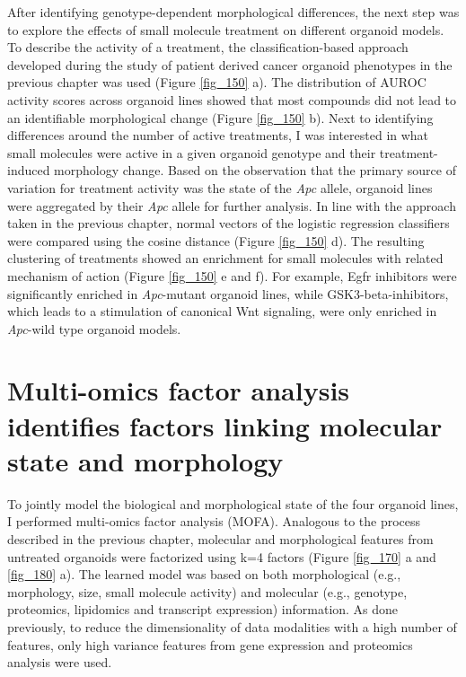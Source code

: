 \begin{flushleft}
After identifying genotype-dependent morphological differences, the next step was to explore the effects of small molecule treatment on different organoid models. To describe the activity of a treatment, the classification-based approach developed during the study of patient derived cancer organoid phenotypes in the previous chapter was used (Figure \ref{fig_150} a). The distribution of AUROC activity scores across organoid lines showed that most compounds did not lead to an identifiable morphological change (Figure \ref{fig_150} b). Next to identifying differences around the number of active treatments, I was interested in what small molecules were active in a given organoid genotype and their treatment-induced morphology change. Based on the observation that the primary source of variation for treatment activity was the state of the \textit{Apc} allele, organoid lines were aggregated by their \textit{Apc} allele for further analysis. In line with the approach taken in the previous chapter, normal vectors of the logistic regression classifiers were compared using the cosine distance (Figure \ref{fig_150} d). The resulting clustering of treatments showed an enrichment for small molecules with related mechanism of action (Figure \ref{fig_150} e and f). For example, Egfr inhibitors were significantly enriched in \textit{Apc}-mutant organoid lines, while GSK3-beta-inhibitors, which leads to a stimulation of canonical Wnt signaling, were only enriched in \textit{Apc}-wild type organoid models. 

\section{Multi-omics factor analysis identifies factors linking molecular state and morphology}

To jointly model the biological and morphological state of the four organoid lines, I performed multi-omics factor analysis (MOFA). Analogous to the process described in the previous chapter, molecular and morphological features from untreated organoids were factorized using k=4 factors (Figure \ref{fig_170} a and \ref{fig_180} a). The learned model was based on both morphological (e.g., morphology, size, small molecule activity) and molecular (e.g., genotype, proteomics, lipidomics and transcript expression) information. As done previously, to reduce the dimensionality of data modalities with a high number of features, only high variance features from gene expression and proteomics analysis were used.


\end{flushleft}
